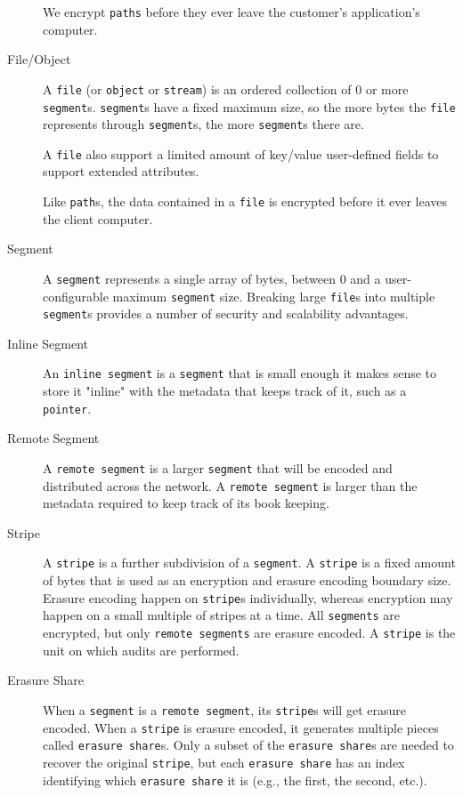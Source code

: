 \documentclass[11pt,fleqn,openany]{book}
\newcommand{\x}[1]{{\tt #1}} \newcommand{\code}[1]{{\tt #1}}
\begin{document}
\begin{description}
We encrypt \x{paths} before they ever leave the customer's application's
computer.

\item[File/Object] A \x{file} (or \x{object} or \x{stream}) is an ordered
collection of 0 or more \x{segment}s. \x{segment}s have a fixed maximum size,
so the more bytes the \x{file} represents through \x{segment}s, the more
\x{segment}s there are.

A \x{file} also support a limited amount of key/value user-defined fields to
support extended attributes.

Like \x{path}s, the data contained in a \x{file} is encrypted before it ever
leaves the client computer.

\item[Segment] A \x{segment} represents a single array of bytes, between 0 and a
user-configurable maximum \x{segment} size. Breaking large \x{file}s into
multiple \x{segment}s provides a number of security and scalability advantages.

\item[Inline Segment] An \x{inline segment} is a \x{segment} that is small
enough it makes sense to store it "inline" with the metadata that keeps track of
it, such as a \x{pointer}.

\item[Remote Segment] A \x{remote segment} is a larger \x{segment} that will be
encoded and distributed across the network. A \x{remote segment} is larger than
the metadata required to keep track of its book keeping.

\item[Stripe] A \x{stripe} is a further subdivision of a \x{segment}. A
\x{stripe} is a fixed amount of bytes that is used as an encryption and erasure
encoding boundary size. Erasure encoding happen on \x{stripe}s individually,
whereas encryption may happen on a small multiple of stripes at a time. All
\x{segments} are encrypted, but only \x{remote segments} are erasure encoded.
A \x{stripe} is the unit on which audits are performed.

\item[Erasure Share] When a \x{segment} is a \x{remote segment}, its \x{stripe}s
will get erasure encoded. When a \x{stripe} is erasure encoded, it generates
multiple pieces called \x{erasure share}s. Only a subset of the \x{erasure
share}s are needed to recover the original \x{stripe}, but each \x{erasure
share} has an index identifying which \x{erasure share} it is (e.g., the first,
the second, etc.).


\end{description}
\end{document}
